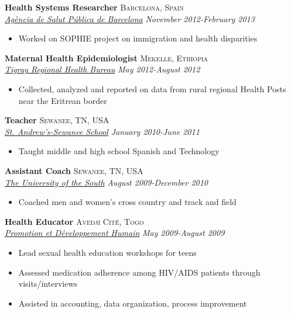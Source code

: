 \documentclass[11pt]{article}
\begin{document}
\noindent \textbf{Health Systems Researcher} \hfill \textsc{Barcelona, Spain}\\
\noindent \emph{\href{http://www.aspb.cat/}{Agència de Salut Pública de Barcelona}} \hfill \emph{November 2012-February 2013}
\vspace{-2mm}
\begin{itemize}\itemsep0pt \parskip0pt 
\item Worked on SOPHIE project on immigration and health disparities 
\end{itemize}

\noindent \textbf{Maternal Health Epidemiologist} \hfill \textsc{Mekelle, Ethiopia}\\
\noindent \emph{\href{http://www.moh.gov.et/tigrayhb}{Tigray Regional Health Bureau}} \hfill \emph{May 2012-August 2012}
\vspace{-2mm}
\begin{itemize}\itemsep0pt \parskip0pt 
\item Collected, analyzed and reported on data from rural regional Health Posts near the Eritrean border
\end{itemize}

\noindent \textbf{Teacher} \hfill \textsc{Sewanee, TN, USA}\\
\noindent \emph{\href{http://www.sasweb.org/}{St. Andrew's-Sewanee School}} \hfill \emph{January 2010-June 2011}
\vspace{-2mm}
\begin{itemize}\itemsep0pt \parskip0pt 
\item Taught middle and high school Spanish and Technology
\end{itemize}

\noindent \textbf{Assistant Coach} \hfill \textsc{Sewanee, TN, USA}\\
\noindent \emph{\href{http://sewanee.edu/}{The University of the South}} \hfill \emph{August 2009-December 2010}
\vspace{-2mm}
\begin{itemize}\itemsep0pt \parskip0pt 
\item Coached men and women's cross country and track and field
\end{itemize}

\noindent \textbf{Health Educator} \hfill \textsc{Avedji Cité, Togo}\\
\noindent \emph{\href{http://www.pdh-togo.org/html/english/welcome.html}{Promotion et Développement Humain}} \hfill \emph{May 2009-August 2009}
\vspace{-2mm}
\begin{itemize}\itemsep0pt \parskip0pt 
\item Lead sexual health education workshops for teens
\item Assessed medication adherence among HIV/AIDS patients through visits/interviews
\item Assisted in accounting, data organization, process improvement

\end{itemize}
\end{document}
